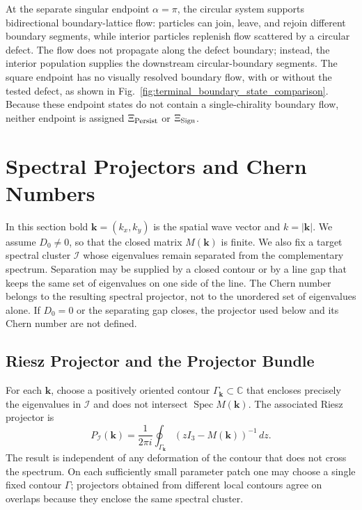 \documentclass[11pt]{article}
\numberwithin{equation}{section}
\begin{document}
At the separate singular endpoint $\alpha=\pi$, the circular system supports
bidirectional boundary-lattice flow: particles can join, leave, and rejoin
different boundary segments, while interior particles replenish flow scattered
by a circular defect.  The flow does not propagate along the defect boundary;
instead, the interior population supplies the downstream circular-boundary
segments.  The square endpoint has no visually resolved boundary flow, with or
without the tested defect, as shown in
Fig.~\ref{fig:terminal_boundary_state_comparison}.  Because these endpoint
states do not contain a single-chirality boundary flow, neither endpoint is
assigned $\Xi_{\rm Persist}$ or $\Xi_{\rm Sign}$.

\section{Spectral Projectors and Chern Numbers}

In this section bold $\mathbf k=(k_x,k_y)$ is the spatial wave vector and
$k=|\mathbf k|$. We assume $D_0\ne0$, so that the closed matrix
$M(\mathbf k)$ is finite. We also fix a target spectral cluster
$\mathcal I$ whose eigenvalues remain separated from the complementary
spectrum. Separation may be supplied by a closed contour or by a line gap
that keeps the same set of eigenvalues on one side of the line. The Chern
number belongs to the resulting spectral projector, not to the unordered
set of eigenvalues alone. If $D_0=0$ or the separating gap closes, the
projector used below and its Chern number are not defined.

\subsection{Riesz Projector and the Projector Bundle}

For each $\mathbf k$, choose a positively oriented contour
$\Gamma_{\mathbf k}\subset\mathbb C$ that encloses precisely the
eigenvalues in $\mathcal I$ and does not intersect
$\operatorname{Spec}M(\mathbf k)$. The associated Riesz projector is
\begin{equation}
  P_{\mathcal I}(\mathbf k)=\frac{1}{2\pi i}
  \oint_{\Gamma_{\mathbf k}}
  (zI_3-M(\mathbf k))^{-1}\,dz .
  \label{eq:riesz_projection}
\end{equation}
The result is independent of any deformation of the contour that does not
cross the spectrum. On each sufficiently small parameter patch one may
choose a single fixed contour $\Gamma$; projectors obtained from different
local contours agree on overlaps because they enclose the same spectral
cluster.
\end{document}

